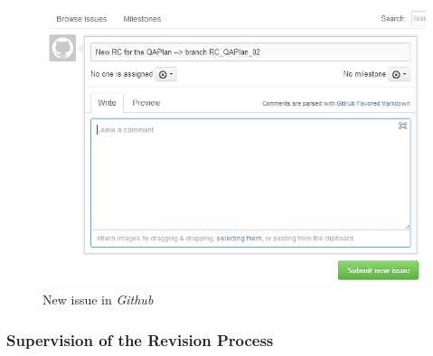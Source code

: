\documentclass{template/openetcs_article}
\begin{document}
\begin{figure}[H]
\centering
\includegraphics [width=\textwidth]{./figures/NewIssue.JPG}
\caption{New issue in {\it Github}}
\end{figure}

\subsubsection{Supervision of the Revision Process}
\end{document}
